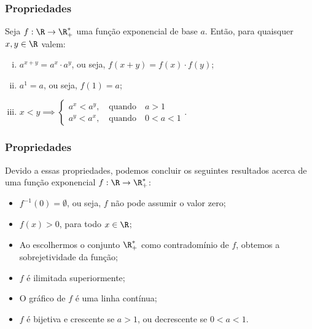 \documentclass[10pt]{beamer}
\begin{document}

\begin{frame}
\frametitle{Propriedades} %

\begin{proposicao}
Seja $f: \R \to \R_+^\ast$ uma função exponencial de base $a$.
Então, para quaisquer $x, y \in \R$ valem:
\begin{enumerate}[(i)]
	\item  $a^{x+y} = a^x\cdot a^y$, ou seja, $f(x+y) = f(x)\cdot f(y)$;
	\item $a^1 = a$, ou seja, $f(1) = a$;
	\item $x<y \implies \begin{cases} a^x < a^y, \ \ \ \text{ quando } \ \ \ a>1 \\
																		a^y < a^x, \ \ \ \text{ quando } \ \ \ 0<a<1
											 \end{cases}.$
\end{enumerate}
\end{proposicao}




\end{frame}


\begin{frame}
\frametitle{Propriedades} %

Devido a essas propriedades, podemos concluir os seguintes
resultados acerca de uma função exponencial $f: \R \to \R_+^\ast$:
\begin{itemize}
	\item $f^{-1}(0) = \emptyset$, ou seja, $f$ não pode assumir o valor
	zero;
	\item $f(x)>0$, para todo $x \in \R$;
	\item Ao escolhermos o conjunto $\R_+^\ast$ como contradomínio de $f$, obtemos
	a sobrejetividade da função;
	\item $f$ é ilimitada superiormente;
	\item O gráfico de $f$ é uma linha contínua;
	\item $f$ é bijetiva e crescente se $a>1$, ou decrescente se
	$0<a<1$.
\end{itemize}
\end{frame}
\end{document}
